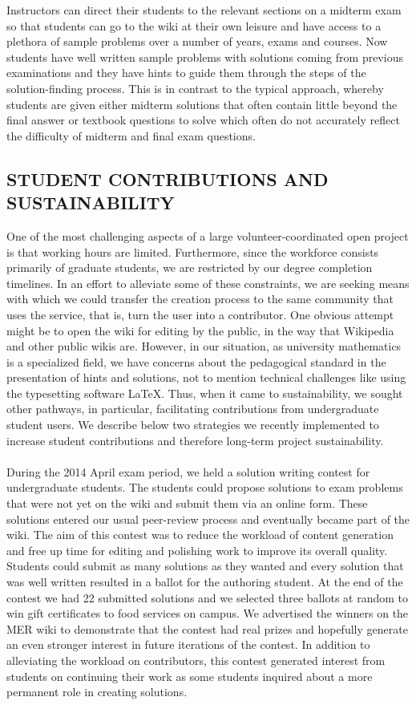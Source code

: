 \documentclass{primus}
\begin{document}
\noindent{}Instructors can direct their students to the relevant sections on a midterm exam so that students can go to the wiki at their own leisure and have access to a plethora of sample problems over a number of years, exams and courses. Now students have well written sample problems with solutions coming from previous examinations and they have hints to guide them through the steps of the solution-finding process. This is in contrast to the typical approach, whereby students are given either midterm solutions that often contain little beyond the final answer or textbook questions to solve which often do not accurately reflect the difficulty of midterm and final exam questions.

\subsection{STUDENT CONTRIBUTIONS AND SUSTAINABILITY}\label{sec:Student_Contributions_and_Sustainability}
One of the most challenging aspects of a large volunteer-coordinated open project is that working hours are limited.  Furthermore, since the workforce consists primarily of graduate students, we are restricted by our degree completion timelines.  In an effort to alleviate some of these constraints, we are seeking means with which we could transfer the creation process to the same community that uses the service, that is, turn the user into a contributor.  One obvious attempt might be to open the wiki for editing by the public, in the way that Wikipedia and other public wikis are.  However, in our situation, as university mathematics is a specialized field, we have concerns about the pedagogical standard in the presentation of hints and solutions, not to mention technical challenges like using the typesetting software LaTeX.  Thus, when it came to sustainability, we sought other pathways, in particular, facilitating contributions from undergraduate student users.  We describe below two strategies we recently implemented to increase student contributions and therefore long-term project sustainability.
\\\\
\noindent{}During the 2014 April exam period, we held a solution writing contest for undergraduate students. The students could propose solutions to exam problems that were not yet on the wiki and submit them via an online form.  These solutions entered our usual peer-review process and eventually became part of the wiki.  The aim of this contest was to reduce the workload of content generation and free up time for editing and polishing work to improve its overall quality. Students could submit as many solutions as they wanted and every solution that was well written resulted in a ballot for the authoring student.  At the end of the contest we had 22 submitted solutions and we selected three ballots at random to win gift certificates to food services on campus. We advertised the winners on the MER wiki to demonstrate that the contest had real prizes and hopefully generate an even stronger interest in future iterations of the contest. In addition to alleviating the workload on contributors, this contest generated interest from students on continuing their work as some students inquired about a more permanent role in creating solutions.
\end{document}
